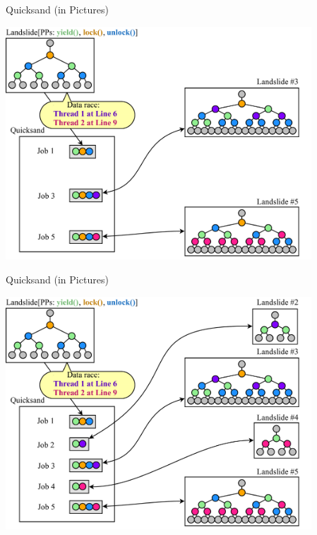 \documentclass[xcolor=dvipsnames]{beamer}
\begin{document}
\begin{frame}{Quicksand (in Pictures)}
	\begin{center}
	\vspace{-0.88em}
	\includegraphics[width=0.86\textwidth]{../../oopsla/dr-jobs-3.pdf}
	\end{center}
\end{frame}
\begin{frame}{Quicksand (in Pictures)}
	\begin{center}
	\vspace{-0.88em}
	\includegraphics[width=0.86\textwidth]{../../oopsla/dr-jobs-4.pdf}
	\end{center}
\end{frame}
\end{document}
